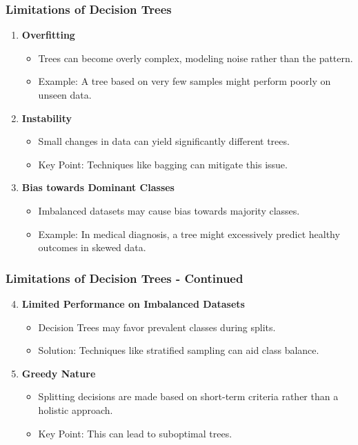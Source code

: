 \documentclass[aspectratio=169]{beamer}
\begin{document}
\begin{frame}[fragile]
    \frametitle{Limitations of Decision Trees}
    \begin{enumerate}
        \item \textbf{Overfitting}
        \begin{itemize}
            \item Trees can become overly complex, modeling noise rather than the pattern.
            \item Example: A tree based on very few samples might perform poorly on unseen data.
        \end{itemize}

        \item \textbf{Instability}
        \begin{itemize}
            \item Small changes in data can yield significantly different trees.
            \item Key Point: Techniques like bagging can mitigate this issue.
        \end{itemize}

        \item \textbf{Bias towards Dominant Classes}
        \begin{itemize}
            \item Imbalanced datasets may cause bias towards majority classes.
            \item Example: In medical diagnosis, a tree might excessively predict healthy outcomes in skewed data.
        \end{itemize}
    \end{enumerate}
\end{frame}

\begin{frame}[fragile]
    \frametitle{Limitations of Decision Trees - Continued}
    \begin{enumerate}
        \setcounter{enumi}{3}
        \item \textbf{Limited Performance on Imbalanced Datasets}
        \begin{itemize}
            \item Decision Trees may favor prevalent classes during splits.
            \item Solution: Techniques like stratified sampling can aid class balance.
        \end{itemize}

        \item \textbf{Greedy Nature}
        \begin{itemize}
            \item Splitting decisions are made based on short-term criteria rather than a holistic approach.
            \item Key Point: This can lead to suboptimal trees.
        \end{itemize}
    \end{enumerate}
\end{frame}
\end{document}
